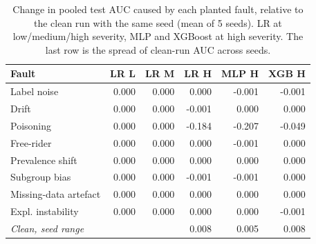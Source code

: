 \begin{table}[t]
\centering
\small
\setlength{\tabcolsep}{4pt}
\caption{Change in pooled test AUC caused by each planted fault, relative to the clean run with the same seed (mean of 5 seeds). LR at low/medium/high severity, MLP and XGBoost at high severity. The last row is the spread of clean-run AUC across seeds.}
\label{tab:pooled}
\begin{tabular}{lrrrrr}
\toprule
Fault & LR L & LR M & LR H & MLP H & XGB H \\
\midrule
Label noise & 0.000 & 0.000 & 0.000 & -0.001 & -0.001 \\
Drift & 0.000 & 0.000 & -0.001 & 0.000 & 0.000 \\
Poisoning & 0.000 & 0.000 & -0.184 & -0.207 & -0.049 \\
Free-rider & 0.000 & 0.000 & 0.000 & -0.001 & 0.000 \\
Prevalence shift & 0.000 & 0.000 & 0.000 & 0.000 & 0.000 \\
Subgroup bias & 0.000 & 0.000 & -0.001 & -0.001 & 0.000 \\
Missing-data artefact & 0.000 & 0.000 & 0.000 & 0.000 & 0.000 \\
Expl. instability & 0.000 & 0.000 & 0.000 & 0.000 & -0.001 \\
\textit{Clean, seed range} &  &  & 0.008 & 0.005 & 0.008 \\
\bottomrule
\end{tabular}
\end{table}
